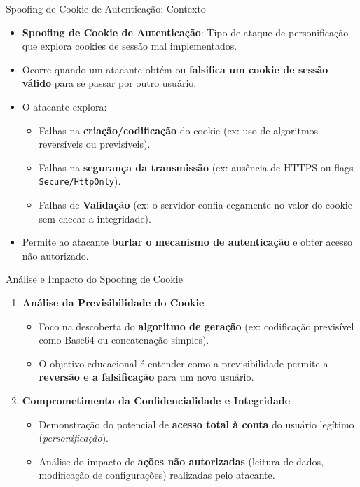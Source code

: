 \documentclass[aspectratio=169]{beamer}
\begin{document}
\begin{frame}{Spoofing de Cookie de Autenticação: Contexto}
    \begin{itemize}
        \item \textbf{Spoofing de Cookie de Autenticação}: Tipo de ataque de personificação que explora cookies de sessão mal implementados.
        \item Ocorre quando um atacante obtém ou \textbf{falsifica um cookie de sessão válido} para se passar por outro usuário.
        \item O atacante explora:
        \begin{itemize}
            \item Falhas na \textbf{criação/codificação} do cookie (ex: uso de algoritmos reversíveis ou previsíveis).
            \item Falhas na \textbf{segurança da transmissão} (ex: ausência de HTTPS ou flags \texttt{Secure/HttpOnly}).
            \item Falhas de \textbf{Validação} (ex: o servidor confia cegamente no valor do cookie sem checar a integridade).
        \end{itemize}
        \item Permite ao atacante \textbf{burlar o mecanismo de autenticação} e obter acesso não autorizado.
    \end{itemize}
\end{frame}

\begin{frame}{Análise e Impacto do Spoofing de Cookie}
    \begin{enumerate}
        \item \textbf{Análise da Previsibilidade do Cookie}
        \begin{itemize}
            \item Foco na descoberta do \textbf{algoritmo de geração} (ex: codificação previsível como Base64 ou concatenação simples).
            \item O objetivo educacional é entender como a previsibilidade permite a \textbf{reversão e a falsificação} para um novo usuário.
        \end{itemize}
        
        \item \textbf{Comprometimento da Confidencialidade e Integridade}
        \begin{itemize}
            \item Demonstração do potencial de \textbf{acesso total à conta} do usuário legítimo (\textit{personificação}).
            \item Análise do impacto de \textbf{ações não autorizadas} (leitura de dados, modificação de configurações) realizadas pelo atacante.
        \end{itemize}
    \end{enumerate}
\end{frame}
\end{document}
